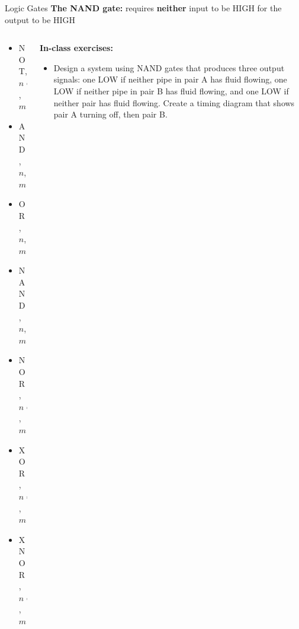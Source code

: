 \documentclass{beamer}
\begin{document}
\begin{frame}{Logic Gates}
\textbf{The NAND gate:} requires \textbf{neither} input to be HIGH for the output to be HIGH \\ \vspace{0.5cm}
\begin{columns}[T]
\begin{column}{0.5\textwidth}
\begin{itemize}
\item \alert{NOT, $n=1$, $m=1$}
\item \alert{AND, $n$, $m=1$}
\item \alert{OR, $n$, $m=1$}
\item \alert{NAND, $n$, $m=1$}
\item NOR, $n=2$, $m=1$
\item XOR, $n=2$, $m=1$
\item XNOR, $n=2$, $m=1$
\end{itemize}
\end{column}
\begin{column}{0.5\textwidth}
\small
\textbf{In-class exercises:}
\begin{itemize}
\item Design a system using NAND gates that produces three output signals: one LOW if neither pipe in pair A has fluid flowing, one LOW if neither pipe in pair B has fluid flowing, and one LOW if neither pair has fluid flowing.  Create a timing diagram that shows pair A turning off, then pair B.
\end{itemize}
\end{column}
\end{columns}
\end{frame}
\end{document}
